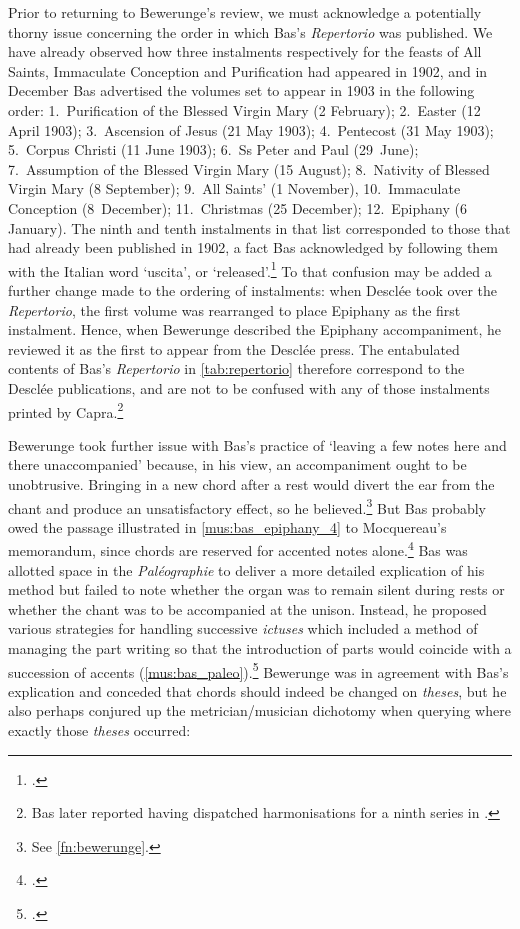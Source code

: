 Prior to returning to Bewerunge's review, we must acknowledge a potentially thorny issue concerning the order in which Bas's \emph{Repertorio} was published.
We have already observed how three instalments respectively for the feasts of All Saints, Immaculate Conception and Purification had appeared in 1902, and in December Bas advertised the volumes set to appear in 1903 in the following order: 1.\ Purification of the Blessed Virgin Mary (2 February); 2.\ Easter (12 April 1903); 3.\ Ascension of Jesus (21 May 1903); 4.~Pentecost (31 May 1903); 5.\ Corpus Christi (11 June 1903); 6.\ Ss Peter and Paul (29~June); 7.\ Assumption of the Blessed Virgin Mary (15 August); 8.\ Nativity of Blessed Virgin Mary (8 September); 9.\ All Saints' (1 November), 10.\ Immaculate Conception (8~December); 11.\ Christmas (25 December); 12.\ Epiphany (6 January).
The ninth and tenth instalments in that list corresponded to those that had already been published in 1902, a fact Bas acknowledged by following them with the Italian word `uscita', or `released'.\footcite[p.~189]{R.Pubblicazionigregoriane1902a}
To that confusion may be added a further change made to the ordering of instalments: when Desclée took over the \emph{Repertorio}, the first volume was rearranged to place Epiphany as the first instalment.
Hence, when Bewerunge described the Epiphany accompaniment, he reviewed it as the first to appear from the Desclée press.
The entabulated contents of Bas's \emph{Repertorio} in \cref{tab:repertorio} therefore correspond to the Desclée publications, and are not to be confused with any of those instalments printed by Capra.\footnote{Bas later reported having dispatched harmonisations for a ninth series in .}
\nowidow[2]

Bewerunge took further issue with Bas's practice of `leaving a few notes here and there unaccompanied' because, in his view, an accompaniment ought to be unobtrusive.
Bringing in a new chord after a rest would divert the ear from the chant and produce an unsatisfactory effect, so he believed.\footnote{See \cref{fn:bewerunge}.}
But Bas probably owed the passage illustrated in \cref{mus:bas_epiphany_4} to Mocquereau's memorandum, since chords are reserved for accented notes alone.\footcite[4]{BasEpiphaniaDomini1904}
%
Bas was allotted space in the \emph{Paléographie} to deliver a more detailed explication of his method but failed to note whether the organ was to remain silent during rests or whether the chant was to be accompanied at the unison.
Instead, he proposed various strategies for handling successive \emph{ictuses} which included a method of managing the part writing so that the introduction of parts would coincide with a succession of accents (\cref{mus:bas_paleo}).\footcite[332]{Basrythmeharmonieleurs1905}
%
Bewerunge was in agreement with Bas's explication and conceded that chords should indeed be changed on \emph{theses}, but he also perhaps conjured up the metrician/musician dichotomy when querying where exactly those \emph{theses} occurred:

